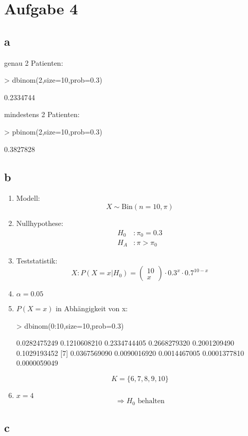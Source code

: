 

\section{Aufgabe 4}
\subsection{a}
genau 2 Patienten: 
\begin{Schunk}
\begin{Sinput}
> dbinom(2,size=10,prob=0.3)
\end{Sinput}
\begin{Soutput}
[1] 0.2334744
\end{Soutput}
\end{Schunk}
mindestens 2 Patienten: 
\begin{Schunk}
\begin{Sinput}
> pbinom(2,size=10,prob=0.3)
\end{Sinput}
\begin{Soutput}
[1] 0.3827828
\end{Soutput}
\end{Schunk}

\subsection{b}
\begin{enumerate}
  \item Modell: \\
        \[ X \sim \text{Bin}(n=10,\pi) \]
  \item Nullhypothese: 
        \[ \begin{array}{ll}
          H_0 &: \pi_0 = 0.3 \\
          H_A &: \pi > \pi_0
        \end{array} \]
  \item Teststatistik: 
        \[ X: P(X=x | H_0) 
        = \left( \begin{array}{l}10\\x\end{array} \right) 
        \cdot 0.3^x \cdot 0.7^{10 - x} \]
  \item $\alpha = 0.05$
  \item $P(X=x)$ in Abhängigkeit von x: 
\begin{Schunk}
\begin{Sinput}
> dbinom(0:10,size=10,prob=0.3)
\end{Sinput}
\begin{Soutput}
 [1] 0.0282475249 0.1210608210 0.2334744405 0.2668279320 0.2001209490 0.1029193452
 [7] 0.0367569090 0.0090016920 0.0014467005 0.0001377810 0.0000059049
\end{Soutput}
\end{Schunk}
        \[ K = \lbrace 6, 7, 8, 9, 10 \rbrace \]
  \item $x=4$\\
        \[ \Rightarrow H_0 \text{ behalten} \]
\end{enumerate}

\subsection{c}

